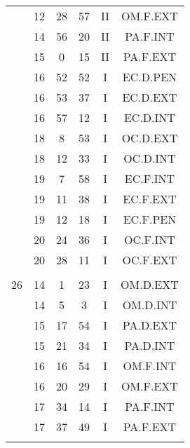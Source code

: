 \documentclass[12pt, a4paper]{article}
\begin{document}
\begin{multicols}{3}
{\begin{tabular}{c c c c c c}
	 	 	 	 & 12 & 28 & 57 & II & OM.F.EXT\\%
	 	 	 	 & 14 & 56 & 20 & II & PA.F.INT\\%
	 	 	 	 & 15 & 0 & 15 & II & PA.F.EXT\\%
	 	 	 	 & 16 & 52 & 52 & I & EC.D.PEN\\%
	 	 	 	 & 16 & 53 & 37 & I & EC.D.EXT\\%
	 	 	 	 & 16 & 57 & 12 & I & EC.D.INT\\%
	 	 	 	 & 18 & 8 & 53 & I & OC.D.EXT\\%
	 	 	 	 & 18 & 12 & 33 & I & OC.D.INT\\%
	 	 	 	 & 19 & 7 & 58 & I & EC.F.INT\\%
	 	 	 	 & 19 & 11 & 38 & I & EC.F.EXT\\%
	 	 	 	 & 19 & 12 & 18 & I & EC.F.PEN\\%
	 	 	 	 & 20 & 24 & 36 & I & OC.F.INT\\%
	 	 	 	 & 20 & 28 & 11 & I & OC.F.EXT\\%
	 	 	 	 & & & & & \\%
	 	 	 	26 & 14 & 1 & 23 & I & OM.D.EXT\\%
	 	 	 	 & 14 & 5 & 3 & I & OM.D.INT\\%
	 	 	 	 & 15 & 17 & 54 & I & PA.D.EXT\\%
	 	 	 	 & 15 & 21 & 34 & I & PA.D.INT\\%
	 	 	 	 & 16 & 16 & 54 & I & OM.F.INT\\%
	 	 	 	 & 16 & 20 & 29 & I & OM.F.EXT\\%
	 	 	 	 & 17 & 34 & 14 & I & PA.F.INT\\%
	 	 	 	 & 17 & 37 & 49 & I & PA.F.EXT\\%
	 	 	 	 & & & & & \\%

\end{tabular}}
\end{multicols}
\end{document}
